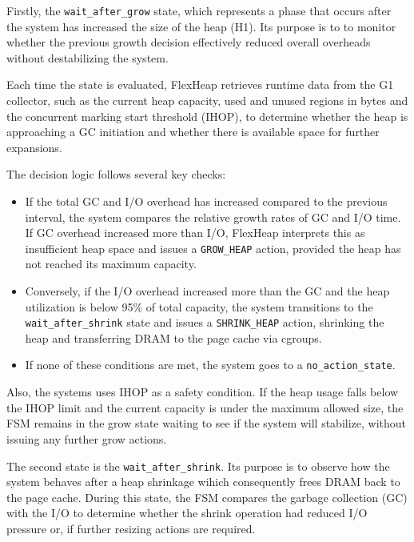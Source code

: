 Firstly, the \texttt{wait\_after\_grow} state, which represents a phase that occurs after 
the system has increased the size of the heap (H1). Its purpose is to 
to monitor whether the previous growth decision effectively 
reduced overall overheads without destabilizing the system. 

Each time the state is evaluated, FlexHeap retrieves runtime data from the G1 collector, 
such as the current heap capacity, used and unused regions in bytes and the concurrent marking 
start threshold (IHOP), to determine whether the heap is approaching 
a GC initiation and whether there is available space for further expansions.

The decision logic follows several key checks:
\begin{itemize}
  \item If the total GC and I/O overhead has increased compared to the previous interval, the system
    compares the relative growth rates of GC and I/O time. If GC overhead increased more than I/O, 
    FlexHeap interprets this as insufficient heap space and issues a \texttt{GROW\_HEAP} action, 
    provided the heap has not reached its maximum capacity. 
  \item Conversely, if the I/O overhead increased more than the GC and the heap utilization is below 95\% of
    total capacity, the system transitions to the \texttt{wait\_after\_shrink} state and issues a 
    \texttt{SHRINK\_HEAP} action, shrinking the heap and transferring DRAM to the page cache via cgroups.
  \item If none of these conditions are met, the system goes to a \texttt{no\_action\_state}.
\end{itemize}

Also, the systems uses IHOP as a safety condition. If the heap usage falls below the 
IHOP limit and the current capacity is under the maximum allowed size, the FSM remains in the 
grow state waiting to see if the system will stabilize, without issuing any further grow actions.

The second state is the \texttt{wait\_after\_shrink}. Its purpose is to 
observe how the system behaves after a heap shrinkage wihich consequently frees DRAM back to the page cache. During this
state, the FSM compares the garbage collection (GC) with the I/O to determine whether
the shrink operation had reduced I/O pressure or, if further resizing actions are required.

